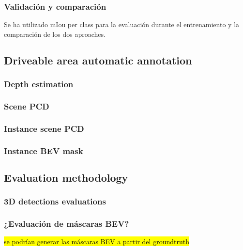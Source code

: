 \subsubsection{Validación y comparación}
Se ha utilizado mIou per class para la evaluación durante el entrenamiento y la comparación de los dos aproaches.


\subsection{ Driveable area automatic annotation}
\label{aplicacion}

\subsubsection{Depth estimation}
\subsubsection{Scene PCD}
\subsubsection{Instance scene PCD}
\subsubsection{Instance BEV mask}

\subsection{Evaluation methodology}
\label{evaluacion}

\subsubsection{3D detections evaluations}
\subsubsection{¿Evaluación de máscaras BEV?}
\hl{se podrían generar las máscaras BEV a partir del groundtruth}


